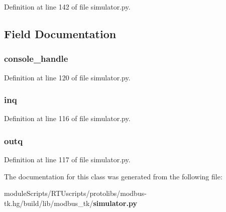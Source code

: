 Definition at line 142 of file simulator.\+py.



\subsection{Field Documentation}
\subsubsection[{console\+\_\+handle}]{\setlength{\rightskip}{0pt plus 5cm}console\+\_\+handle}\label{classmodbus__tk_1_1simulator_1_1_console_interface_ad88fb0161262101465095cd2584b4cd9}


Definition at line 120 of file simulator.\+py.

\subsubsection[{inq}]{\setlength{\rightskip}{0pt plus 5cm}inq}\label{classmodbus__tk_1_1simulator_1_1_console_interface_a91427ee78ba64d8a058f752b2302ebb1}


Definition at line 116 of file simulator.\+py.

\subsubsection[{outq}]{\setlength{\rightskip}{0pt plus 5cm}outq}\label{classmodbus__tk_1_1simulator_1_1_console_interface_a0a054acbb30640bba43b4bab678773c6}


Definition at line 117 of file simulator.\+py.



The documentation for this class was generated from the following file\+:\begin{DoxyCompactItemize}
\item 
module\+Scripts/\+R\+T\+Uscripts/protolibs/modbus-\/tk.\+hg/build/lib/modbus\+\_\+tk/{\bf simulator.\+py}\end{DoxyCompactItemize}
